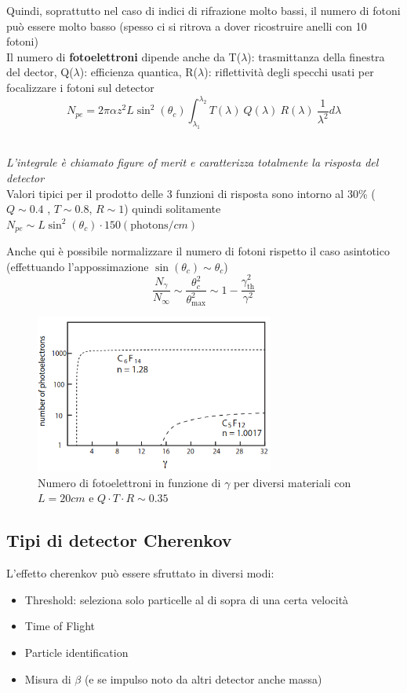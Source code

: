 Quindi, soprattutto nel caso di indici di rifrazione molto bassi, il numero di fotoni può essere molto basso (spesso ci si ritrova a dover ricostruire anelli con 10 fotoni)
\\ 
Il numero di \textbf{fotoelettroni}  dipende anche da T($\lambda$): trasmittanza della finestra del dector, Q($\lambda$): efficienza quantica, R($\lambda$): riflettività degli specchi usati per focalizzare i fotoni sul detector
\[N_{pe}=2 \pi \alpha z^2 L \sin^2(\theta_c)\int_{\lambda_{1}}^{\lambda_{2}}T(\lambda)\: Q(\lambda) \: R(\lambda) \: \frac{1}{\lambda^2}d\lambda\]
\begin{details}\hfill \\
    \textit{L'integrale è chiamato figure of merit e caratterizza totalmente la risposta del detector } \\ 
    Valori tipici per il prodotto delle 3 funzioni di risposta sono intorno al 30\% ($Q\sim0.4$ , $T\sim0.8$,  $R\sim1$) quindi solitamente $N_{pe}\sim L \sin^2(\theta_c) \cdot150 (\text{photons}/cm)$
\end{details}
Anche qui è possibile normalizzare il numero di fotoni rispetto il caso asintotico (effettuando l'appossimazione $\sin(\theta_c)\sim \theta_c$)
\[\frac{N_\gamma}{N_\infty}\sim\frac{\theta_c^2}{\theta^2_\text{max}}\sim1-\frac{\gamma^2_\text{th}}{\gamma^2}\]

\begin{figure}[H]
    \centering
    \includegraphics[width=0.7\textwidth,frame]{Chapters/images/Particle_identification/image-20220317174427644.png}
    \captionsetup{width=0.7\textwidth}
    \caption{Numero di fotoelettroni in funzione di $\gamma$ per diversi materiali con $L=20cm$ e $ Q \cdot T \cdot R \sim 0.35$}
    \label{fig:}
\end{figure}

\subsection{Tipi di detector Cherenkov}
L'effetto cherenkov può essere sfruttato in diversi modi:
\begin{itemize}
    \item Threshold: seleziona solo particelle al di sopra di una certa velocità
\item Time of Flight
\item Particle identification
\item Misura di $\beta$ (e se impulso noto da altri detector anche massa)
\end{itemize}


